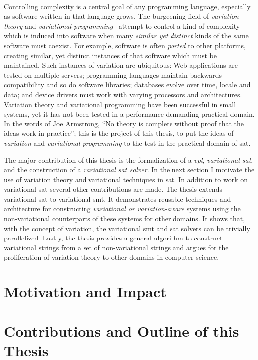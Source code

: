 ~\label{chapter:introduction}%

Controlling complexity is a central goal of any programming language, especially
as software written in that language grows. The burgeoning field of
\emph{variation theory} and \emph{variational
  programming}~\cite{EW11gttse,EW11tosem,HW16fosd,CEW16ecoop,Walk14onward}
attempt to control a kind of complexity which is induced into software when many
\emph{similar yet distinct} kinds of the same software must coexist. For
example, software is often \emph{ported} to other platforms, creating similar,
yet distinct instances of that software which must be maintained. Such instances
of variation are ubiquitous: Web applications are tested on multiple servers;
programming languages maintain backwards compatibility and so do software
libraries; databases evolve over time, locale and data; and device drivers must
work with varying processors and architectures. Variation theory and variational
programming have been successful in small systems, yet it has not been tested in a performance demanding
practical domain. In the words of Joe Armstrong\cite{armstrongThesis}, ``No
theory is complete without proof that the ideas work in practice''; this is the
project of this thesis, to put the ideas of \emph{variation} and
\emph{variational programming} to the test in the practical domain of \ac{sat}.

The major contribution of this thesis is the formalization of a \emph{\ac{vpl}},
\emph{variational \acl{sat}}, and the construction of a \emph{variational
  \ac{sat} solver}. In the next section I motivate the use of variation theory
and variational techniques in \acl{sat}. In addition to work on variational
\ac{sat} several other contributions are made. The thesis extends variational
\acl{sat} to variational \ac{smt}. It demonstrates reusable techniques and
architecture for constructing \emph{variational or variation-aware} systems
using the non-variational counterparts of these systems for other domains. It
shows that, with the concept of variation, the variational \ac{smt} and \ac{sat}
solvers can be trivially parallelized. Lastly, the thesis provides a general
algorithm to construct variational strings from a set of non-variational strings
and argues for the proliferation of variation theory to other domains in
computer science.

\section{Motivation and Impact}


\section{Contributions and Outline of this Thesis}


